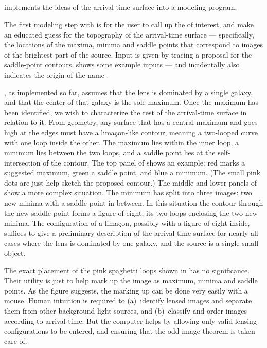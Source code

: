 \FloatBarrier
\subsection{\spl} \label{sec:SpaghettiLens}

\spl implements the ideas of the arrival-time surface into a modeling
program.

The first modeling step with \spl is for the user to call up the \sw
of interest, and make an educated guess for the topography of the
arrival-time surface --- specifically, the locations of the maxima,
minima and saddle points that correspond to images of the brightest
part of the source.  Input is given by tracing a proposal for the
saddle-point contours.   shows some example
inputs --- and incidentally also indicates the origin of the name
\spl.

\spl, as implemented so far, assumes that the lens is dominated by a
single galaxy, and that the center of that galaxy is the sole maximum.
Once the maximum has been identified, we wish to characterize the rest
of the arrival-time surface in relation to it.  From geometry, any
surface that has a central maximum and goes high at the edges must
have a lima\c con-like contour, meaning a two-looped curve with one
loop inside the other.  The maximum lies within the inner loop, a
minimum lies between the two loops, and a saddle point lies at the
self-intersection of the contour.  The top panel of
 shows an example: red marks a suggested
maximum, green a saddle point, and blue a minimum.  (The small pink
dots are just help sketch the proposed contour.)  The middle and lower
panels of  show a more complex situation.
The minimum has split into three images: two new minima with a saddle
point in between.  In this situation the contour through the new
saddle point forms a figure of eight, its two loops enclosing the two
new minima.  The configuration of a lima\c con, possibly with a figure
of eight inside, suffices to give a preliminary description of the
arrival-time surface for nearly all cases where the lens is dominated
by one galaxy, and the source is a single small object.

The exact placement of the pink spaghetti loops shown in
 has no significance.  Their utility is
just to help mark up the image as maximum, minima and saddle points.
As the figure suggests, the marking up can be done very easily with a
mouse.  Human intuition is required to (a)~identify lensed images and
separate them from other background light sources, and (b)~classify
and order images according to arrival time.  But the computer helps by
allowing only valid lensing configurations to be entered, and ensuring
that the odd image theorem is taken care of.%

